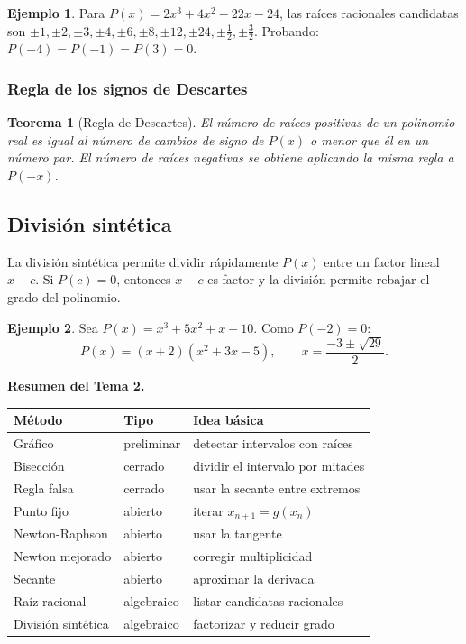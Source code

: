 \documentclass[a4paper,12pt]{article}
\theoremstyle{definition}
\newtheorem{ejemplo}{Ejemplo}[section]
\theoremstyle{plain}
\newtheorem{teorema}{Teorema}[section]
\begin{document}
\begin{ejemplo}
Para $P(x)=2x^3+4x^2-22x-24$, las raíces racionales candidatas son
$\pm 1,\pm 2,\pm 3,\pm 4,\pm 6,\pm 8,\pm 12,\pm 24,\pm\tfrac12,\pm\tfrac32$.
Probando: $P(-4)=P(-1)=P(3)=0$.
\end{ejemplo}

\subsubsection{Regla de los signos de Descartes}

\begin{teorema}[Regla de Descartes]
El número de raíces positivas de un polinomio real es igual al número de
cambios de signo de $P(x)$ o menor que él en un número par. El número de
raíces negativas se obtiene aplicando la misma regla a $P(-x)$.
\end{teorema}

\subsection{División sintética}

La división sintética permite dividir rápidamente $P(x)$ entre un factor
lineal $x-c$. Si $P(c)=0$, entonces $x-c$ es factor y la división permite
rebajar el grado del polinomio.

\begin{ejemplo}
Sea $P(x)=x^3+5x^2+x-10$. Como $P(-2)=0$:
\[
P(x)=(x+2)(x^2+3x-5),
\qquad
x=\frac{-3\pm\sqrt{29}}{2}.
\]
\end{ejemplo}

\begin{cajaresultado}
\textbf{Resumen del Tema 2.}
\begin{center}
\begin{tabular}{p{3.2cm}p{3.2cm}p{5.3cm}}
\toprule
Método & Tipo & Idea básica \\
\midrule
Gráfico & preliminar & detectar intervalos con raíces \\
Bisección & cerrado & dividir el intervalo por mitades \\
Regla falsa & cerrado & usar la secante entre extremos \\
Punto fijo & abierto & iterar $x_{n+1}=g(x_n)$ \\
Newton-Raphson & abierto & usar la tangente \\
Newton mejorado & abierto & corregir multiplicidad \\
Secante & abierto & aproximar la derivada \\
Raíz racional & algebraico & listar candidatas racionales \\
División sintética & algebraico & factorizar y reducir grado \\
\bottomrule
\end{tabular}
\end{center}
\end{cajaresultado}
\end{document}
